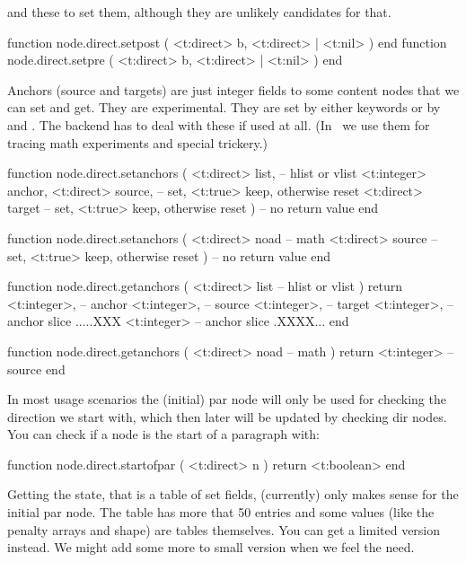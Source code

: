 and these to set them, although they are unlikely candidates for that.

\starttyping[option=LUA]
function node.direct.setpost ( <t:direct> b, <t:direct> | <t:nil> ) end
function node.direct.setpre  ( <t:direct> b, <t:direct> | <t:nil> ) end
\stoptyping

Anchors (source and targets) are just integer fields to some content nodes that
we can set and get. They are experimental. They are set by either keywords or by
 and . The backend has to deal with these if
used at all. (In \CONTEXT\ we use them for tracing math experiments and special
trickery.)

\starttyping[option=LUA]
function node.direct.setanchors (
    <t:direct>  list,   -- hlist or vlist
    <t:integer> anchor,
    <t:direct>  source, -- set, <t:true> keep, otherwise reset
    <t:direct>  target  -- set, <t:true> keep, otherwise reset
)
    -- no return value
end

function node.direct.setanchors (
    <t:direct> noad -- math
    <t:direct> source -- set, <t:true> keep, otherwise reset
)
    -- no return value
end
\stoptyping

\starttyping[option=LUA]
function node.direct.getanchors (
    <t:direct> list  -- hlist or vlist
)
    return
        <t:integer>, -- anchor
        <t:integer>, -- source
        <t:integer>, -- target
        <t:integer>, -- anchor slice .....XXX
        <t:integer>  -- anchor slice .XXXX...
end

function node.direct.getanchors (
    <t:direct> noad -- math
)
    return
        <t:integer> -- source
end
\stoptyping

\stopsubsection

\startsubsection[title={Paragraphs}]

In most usage scenarios the (initial) par node will only be used for checking the
direction we start with, which then later will be updated by checking dir nodes. You can
check if a node is the start of a paragraph with:

\starttyping[option=LUA]
function node.direct.startofpar ( <t:direct> n ) return <t:boolean> end
\stoptyping

Getting the state, that is a table of set fields, (currently) only makes sense
for the initial par node. The table has more that 50 entries and some values
(like the penalty arrays and shape) are tables themselves. You can get a limited
version instead. We might add some more to small version when we feel the need.

